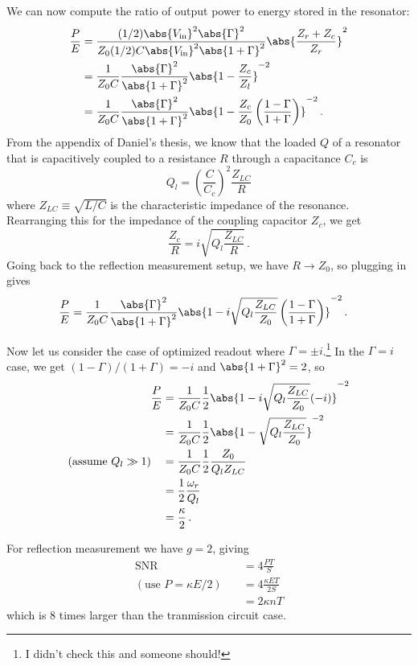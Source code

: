 We can now compute the ratio of output power to energy stored in the resonator:
\begin{align}
  \frac{P}{E}
    &= \frac{(1/2) \abs{V_\text{in}}^2 \abs{\Gamma}^2}
            {Z_0 (1/2) C \abs{V_\text{in}}^2 \abs{1 + \Gamma}^2}
       \abs{\frac{Z_r + Z_c}{Z_r}}^2 \\
    &= \frac{1}{Z_0 C} \frac{\abs{\Gamma}^2}{\abs{1 + \Gamma}^2}
       \abs{1 - \frac{Z_c}{Z_l}}^{-2} \\
    &= \frac{1}{Z_0 C} \frac{\abs{\Gamma}^2}{\abs{1 + \Gamma}^2}
       \abs{1 - \frac{Z_c}{Z_0} \left( \frac{1-\Gamma}{1+\Gamma} \right)}^{-2} \, .
\end{align}
From the appendix of Daniel's thesis, we know that the loaded $Q$ of a resonator that is capacitively coupled to a resistance $R$ through a capacitance $C_c$ is
\begin{equation}
  Q_l = \left( \frac{C}{C_c} \right)^2 \frac{Z_{LC}}{R}
\end{equation}
where $Z_{LC} \equiv \sqrt{L/C}$ is the characteristic impedance of the resonance.
Rearranging this for the impedance of the coupling capacitor $Z_c$, we get
\begin{equation}
  \frac{Z_c}{R} = i \sqrt{Q_l \frac{Z_{LC}}{R}} \, .
\end{equation}
Going back to the reflection measurement setup, we have $R \to Z_0$, so plugging in gives
\begin{align}
  \frac{P}{E}
    &= \frac{1}{Z_0 C} \frac{\abs{\Gamma}^2}{\abs{1 + \Gamma}^2}
       \abs{1 - i \sqrt{Q_l \frac{Z_{LC}}{Z_0}}
       \left( \frac{1-\Gamma}{1+\Gamma} \right)}^{-2} \, .
\end{align}

Now let us consider the case of optimized readout where $\Gamma = \pm i$.\footnote{I didn't check this and someone should!}
In the $\Gamma = i$ case, we get $(1-\Gamma)/(1+\Gamma)=-i$ and $\abs{1+\Gamma}^2=2$, so
\begin{align}
  \frac{P}{E}
  &= \frac{1}{Z_0 C} \frac{1}{2} \abs{1 - i \sqrt{Q_l \frac{Z_{LC}}{Z_0}} (-i)}^{-2} \\
  &= \frac{1}{Z_0 C} \frac{1}{2} \abs{1 - \sqrt{Q_l \frac{Z_{LC}}{Z_0}}}^{-2} \\
  (\text{assume } Q_l \gg 1) \quad &= \frac{1}{Z_0 C} \frac{1}{2} \frac{Z_0}{Q_l Z_{LC}} \\
  &= \frac{1}{2} \frac{\omega_r}{Q_l} \\
  &= \frac{\kappa}{2} \, .
\end{align}

For reflection measurement we have $g=2$, giving
\begin{align}
  \text{SNR}
    &= 4 \frac{PT}{S} \\
    (\text{use } P = \kappa E/2) \quad &= 4 \frac{\kappa E T}{2S} \\
    &= 2 \kappa n T
\end{align}
which is 8 times larger than the tranmission circuit case.

